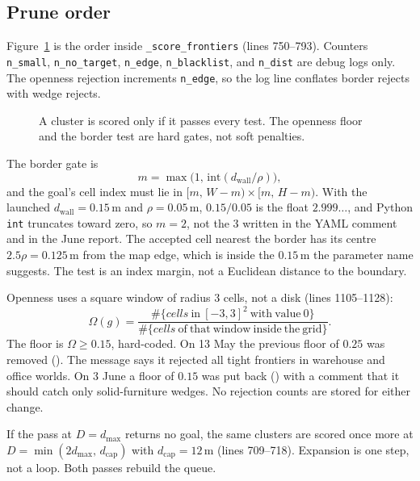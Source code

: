 \documentclass[11pt]{article}
\begin{document}
\subsection{Prune order}
Figure~\ref{fig:prune} is the order inside \texttt{\_score\_frontiers} (lines 750--793). Counters \texttt{n\_small}, \texttt{n\_no\_target}, \texttt{n\_edge}, \texttt{n\_blacklist}, and \texttt{n\_dist} are debug logs only. The openness rejection increments \texttt{n\_edge}, so the log line conflates border rejects with wedge rejects.

\begin{figure}[ht]
\centering
\FigPrune
\caption{A cluster is scored only if it passes every test. The openness floor and the border test are hard gates, not soft penalties.}
\label{fig:prune}
\end{figure}

The border gate is
\begin{equation}
m=\max\big(1,\,\mathrm{int}(d_{\mathrm{wall}}/\rho)\big),
\label{eq:margin}
\end{equation}
and the goal's cell index must lie in $[m,\,W-m)\times[m,\,H-m)$. With the launched $d_{\mathrm{wall}}=0.15$\,m and $\rho=0.05$\,m, $0.15/0.05$ is the float $2.999\ldots$, and Python \texttt{int} truncates toward zero, so $m=2$, not the $3$ written in the YAML comment and in the June report. The accepted cell nearest the border has its centre $2.5\rho=0.125$\,m from the map edge, which is inside the $0.15$\,m the parameter name suggests. The test is an index margin, not a Euclidean distance to the boundary.

Openness uses a square window of radius $3$ cells, not a disk (lines 1105--1128):
\begin{equation}
\Omega(g)=\frac{\#\{cells\ \mathrm{in}\ [-3,3]^2\ \mathrm{with\ value}\ 0\}}{\#\{cells\ \mathrm{of\ that\ window\ inside\ the\ grid}\}}.
\label{eq:open}
\end{equation}
The floor is $\Omega\ge 0.15$, hard-coded. On 13 May the previous floor of $0.25$ was removed (). The message says it rejected all tight frontiers in warehouse and office worlds. On 3 June a floor of $0.15$ was put back () with a comment that it should catch only solid-furniture wedges. No rejection counts are stored for either change.

If the pass at $D=d_{\max}$ returns no goal, the same clusters are scored once more at $D=\min(2 d_{\max},\,d_{\mathrm{cap}})$ with $d_{\mathrm{cap}}=12$\,m (lines 709--718). Expansion is one step, not a loop. Both passes rebuild the queue.
\end{document}
